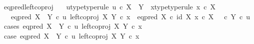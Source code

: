 \begin{isabellebody}
{}
\isamarkuptrue%
%
\endisatagdocument
{\isafolddocument}%
%
\isadelimdocument
%
\endisadelimdocument
{}\isamarkupfalse%
\ eq{\isacharunderscore}{\kern0pt}pred{\isacharunderscore}{\kern0pt}left{\isacharunderscore}{\kern0pt}coproj{\isacharcolon}{\kern0pt}\isanewline
\ \ \ u{\isacharunderscore}{\kern0pt}type{\isacharbrackleft}{\kern0pt}type{\isacharunderscore}{\kern0pt}rule{\isacharbrackright}{\kern0pt}{\isacharcolon}{\kern0pt}\ {\isachardoublequoteopen}u\ {\isasymin}\isactrlsub c\ X\ {\isasymCoprod}\ Y{\isachardoublequoteclose}\ \ x{\isacharunderscore}{\kern0pt}type{\isacharbrackleft}{\kern0pt}type{\isacharunderscore}{\kern0pt}rule{\isacharbrackright}{\kern0pt}{\isacharcolon}{\kern0pt}\ {\isachardoublequoteopen}x\ {\isasymin}\isactrlsub c\ X{\isachardoublequoteclose}\isanewline
\ \ \ {\isachardoublequoteopen}eq{\isacharunderscore}{\kern0pt}pred\ {\isacharparenleft}{\kern0pt}X\ {\isasymCoprod}\ Y{\isacharparenright}{\kern0pt}\ {\isasymcirc}\isactrlsub c\ {\isasymlangle}u{\isacharcomma}{\kern0pt}\ left{\isacharunderscore}{\kern0pt}coproj\ X\ Y\ {\isasymcirc}\isactrlsub c\ x{\isasymrangle}\ {\isacharequal}{\kern0pt}\ {\isacharparenleft}{\kern0pt}{\isacharparenleft}{\kern0pt}eq{\isacharunderscore}{\kern0pt}pred\ X\ {\isasymcirc}\isactrlsub c\ {\isasymlangle}id\ X{\isacharcomma}{\kern0pt}\ x\ {\isasymcirc}\isactrlsub c\ {\isasymbeta}\isactrlbsub X\isactrlesub {\isasymrangle}{\isacharparenright}{\kern0pt}\ {\isasymamalg}\ {\isacharparenleft}{\kern0pt}{\isasymf}\ {\isasymcirc}\isactrlsub c\ {\isasymbeta}\isactrlbsub Y\isactrlesub {\isacharparenright}{\kern0pt}{\isacharparenright}{\kern0pt}\ {\isasymcirc}\isactrlsub c\ u{\isachardoublequoteclose}\isanewline
%
\isadelimproof
%
\endisadelimproof
%
\isatagproof
{}\isamarkupfalse%
\ {\isacharparenleft}{\kern0pt}cases\ {\isachardoublequoteopen}eq{\isacharunderscore}{\kern0pt}pred\ {\isacharparenleft}{\kern0pt}X\ {\isasymCoprod}\ Y{\isacharparenright}{\kern0pt}\ {\isasymcirc}\isactrlsub c\ {\isasymlangle}u{\isacharcomma}{\kern0pt}\ left{\isacharunderscore}{\kern0pt}coproj\ X\ Y\ {\isasymcirc}\isactrlsub c\ x{\isasymrangle}{\isacharequal}{\kern0pt}\ {\isasymt}{\isachardoublequoteclose}{\isacharparenright}{\kern0pt}\isanewline
\ \ \isamarkupfalse%
\ case{}{\isacharcolon}{\kern0pt}\ {\isachardoublequoteopen}eq{\isacharunderscore}{\kern0pt}pred\ {\isacharparenleft}{\kern0pt}X\ {\isasymCoprod}\ Y{\isacharparenright}{\kern0pt}\ {\isasymcirc}\isactrlsub c\ {\isasymlangle}u{\isacharcomma}{\kern0pt}\ left{\isacharunderscore}{\kern0pt}coproj\ X\ Y\ {\isasymcirc}\isactrlsub c\ x{\isasymrangle}\ {\isacharequal}{\kern0pt}\ {\isasymt}{\isachardoublequoteclose}\isanewline

\end{isabellebody}
